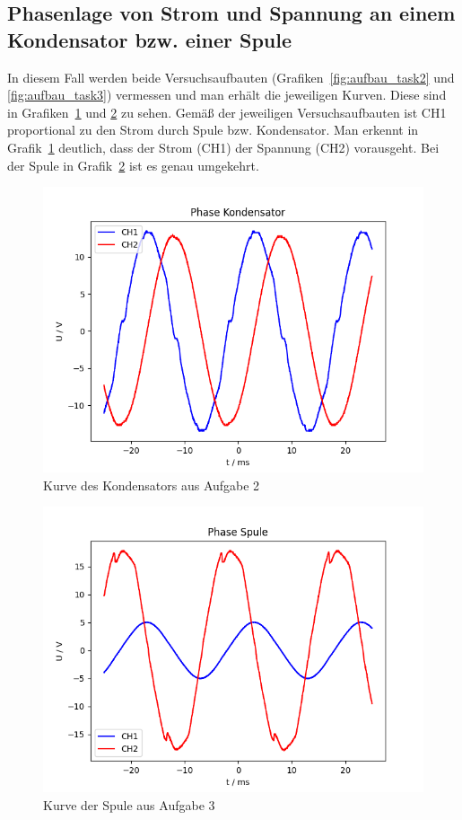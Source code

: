 \documentclass{article}
\begin{document}
\subsection{Phasenlage von Strom und Spannung an einem Kondensator bzw. einer Spule}

In diesem Fall werden beide Versuchsaufbauten (Grafiken~\ref{fig:aufbau_task2} und \ref{fig:aufbau_task3}) vermessen und man erhält die jeweiligen Kurven. Diese sind in Grafiken~\ref{fig:task2_kurve} und \ref{fig:task3_kurve} zu sehen. Gemäß der jeweiligen Versuchsaufbauten ist CH1 proportional zu den Strom durch Spule bzw. Kondensator. Man erkennt in Grafik~\ref{fig:task2_kurve} deutlich, dass der Strom (CH1) der Spannung (CH2) vorausgeht. Bei der Spule in Grafik~\ref{fig:task3_kurve} ist es genau umgekehrt.

\begin{figure}[H]
\centering
\caption{Kurve des Kondensators aus Aufgabe 2}
\label{fig:task2_kurve}
\includegraphics[scale=0.5]{bilder/task2.png}
\end{figure}

\begin{figure}[H]
\centering
\caption{Kurve der Spule aus Aufgabe 3}
\label{fig:task3_kurve}
\includegraphics[scale=0.5]{bilder/task3.png}
\end{figure}
\end{document}
